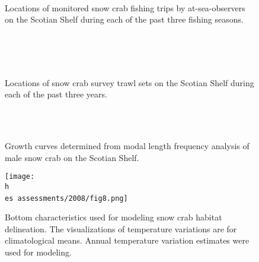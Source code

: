 \documentclass[11pt]{article}
\newcommand{\D}{.}
\newcommand{\h}{/home/hubleyb/}
\newcommand{\es}{bio.data/bio.snowcrab/}
\begin{document}
\begin{figure}
    \centering
   \\
  \\
    \\
  \caption{Locations of monitored snow crab fishing trips by at-sea-observers on the Scotian Shelf during each of the past three fishing seasons.}

\end{figure}
\clearpage
\begin{figure}
    \centering
  \\
    \\
      \\
\caption{Locations of snow crab survey trawl sets on the Scotian Shelf during each of the past three years.}

\end{figure}
\clearpage
\begin{figure}
    \centering
   \\
\\
\caption{Growth curves determined from modal length frequency analysis of male snow crab on the Scotian Shelf.}

\end{figure}
\clearpage
\begin{figure}
    \centering
\texttt{[image: \\h \\es assessments/2008/fig8.png]}\

\caption{Bottom characteristics used for modeling snow crab habitat delineation. The visualizations of temperature variations are for climatological means. Annual temperature variation estimates were used for modeling.}

\end{figure}
\clearpage
\end{document}
